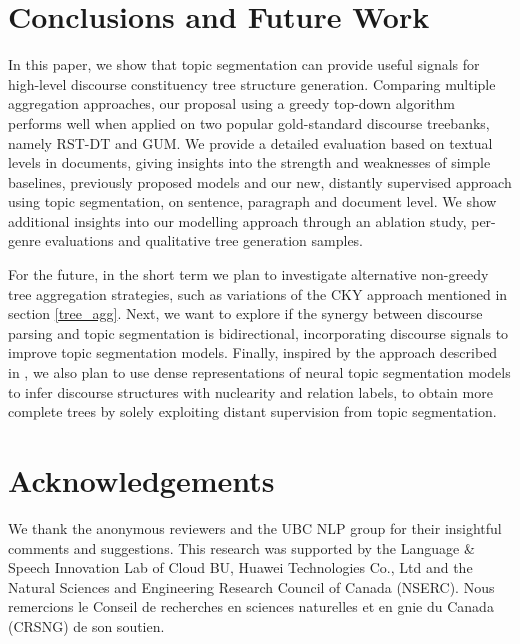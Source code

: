 \documentclass[letterpaper]{article} %
\begin{document}
\section{Conclusions and Future Work}
In this paper, we show that topic segmentation can provide useful signals for high-level discourse constituency tree structure generation. Comparing multiple aggregation approaches, our proposal using a greedy top-down algorithm performs well when applied on two popular gold-standard discourse treebanks, namely RST-DT and GUM. We provide a detailed evaluation based on textual levels in documents, giving insights into the strength and weaknesses of simple baselines, previously proposed models and our new, distantly supervised approach using topic segmentation, on sentence, paragraph and document level. We  show additional insights into our modelling approach through an ablation study, per-genre evaluations and qualitative tree generation samples.

For the future, in the short term we plan to investigate alternative non-greedy tree aggregation strategies, such as variations of the CKY approach mentioned in section \ref{tree_agg}. Next, we want to explore if the synergy between discourse parsing and topic segmentation is bidirectional, incorporating discourse signals to improve topic segmentation models. Finally, inspired by the approach described in \citet{kobayashi-etal-2019-split}, we also plan to use dense representations of neural topic segmentation models to infer discourse structures with nuclearity and relation labels, to obtain more complete trees by solely exploiting distant supervision from topic segmentation.

\section*{Acknowledgements}
We thank the anonymous reviewers and the UBC NLP group for their insightful comments and suggestions. This research was supported by the Language \& Speech Innovation Lab of Cloud BU, Huawei Technologies Co., Ltd and the Natural Sciences and Engineering Research Council of Canada (NSERC). Nous remercions le Conseil de recherches en sciences naturelles et en gnie du Canada (CRSNG) de son soutien.
\end{document}
